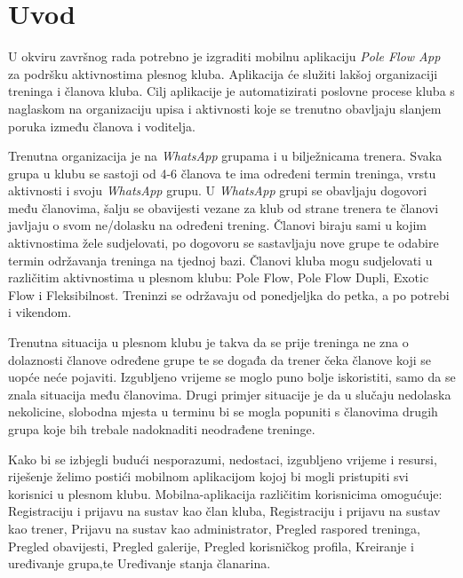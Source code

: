 \documentclass[times, utf8, zavrsni]{fer}
\begin{document}

\zahvala{}

\tableofcontents

\chapter{Uvod}
    U okviru završnog rada potrebno je izgraditi mobilnu aplikaciju \textit{Pole Flow App} za podršku aktivnostima plesnog kluba. Aplikacija će služiti lakšoj organizaciji treninga i članova kluba. Cilj aplikacije je automatizirati poslovne procese kluba s naglaskom na organizaciju upisa i aktivnosti koje se trenutno obavljaju slanjem poruka između članova i voditelja. 
    
    Trenutna organizacija je na \textit{WhatsApp} grupama i u bilježnicama trenera. Svaka grupa u klubu se sastoji od 4-6 članova te ima određeni termin treninga, vrstu aktivnosti i svoju \textit{WhatsApp} grupu. U \textit{WhatsApp} grupi se obavljaju dogovori među članovima, šalju se obavijesti vezane za klub od strane trenera te članovi javljaju o svom ne/dolasku na određeni trening. Članovi biraju sami u kojim aktivnostima žele sudjelovati, po dogovoru se sastavljaju nove grupe te odabire termin održavanja treninga na tjednoj bazi. Članovi kluba mogu sudjelovati u različitim aktivnostima u plesnom klubu: Pole Flow, Pole Flow Dupli, Exotic Flow i Fleksibilnost. Treninzi se održavaju od ponedjeljka do petka, a po potrebi i vikendom. 
    
    Trenutna situacija u plesnom klubu je takva da se prije treninga ne zna o dolaznosti članove određene grupe te se događa da trener čeka članove koji se uopće neće pojaviti. Izgubljeno vrijeme se moglo puno bolje iskoristiti, samo da se znala situacija među članovima. Drugi primjer situacije je da u slučaju nedolaska nekolicine, slobodna mjesta u terminu bi se mogla popuniti s članovima drugih grupa koje bih trebale nadoknaditi neodrađene treninge. 
    
    Kako bi se izbjegli budući nesporazumi, nedostaci, izgubljeno vrijeme i resursi, riješenje želimo postići mobilnom aplikacijom kojoj bi mogli pristupiti svi korisnici u plesnom klubu. Mobilna-aplikacija različitim korisnicima omogućuje:
    Registraciju i prijavu na sustav kao član kluba, Registraciju i prijavu na sustav kao trener, Prijavu na sustav kao administrator, Pregled raspored treninga, Pregled obavijesti, Pregled galerije, Pregled korisničkog profila, Kreiranje i uređivanje grupa,te Uređivanje stanja članarina.
	
\end{document}
